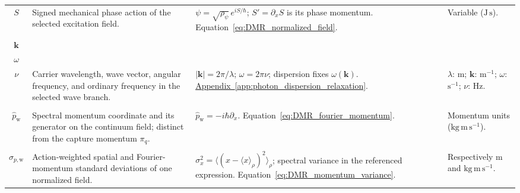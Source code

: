 \begin{longtable}{@{} c p{5.5cm} p{4cm} p{3.5cm} @{}}
$S$ & {\raggedright Signed mechanical phase action of the selected excitation field.\par} & {\raggedright $\psi=\sqrt{\rho_\psi}\,e^{iS/\hbar}$; $S'=\partial_xS$ is its phase momentum. \newline Equation~\eqref{eq:DMR_normalized_field}.\par} & {\raggedright Variable ($\mathrm{J\,s}$).\par} \\

\begin{tabular}[c]{@{}c@{}}$\lambda$ \\ $\mathbf k$ \\ $\omega$ \\ $\nu$\end{tabular} & {\raggedright Carrier wavelength, wave vector, angular frequency, and ordinary frequency in the selected wave branch.\par} & {\raggedright $|\mathbf k|=2\pi/\lambda$; $\omega=2\pi\nu$; dispersion fixes $\omega(\mathbf k)$. \newline \hyperref[app:photon_dispersion_relaxation]{Appendix~\ref*{app:photon_dispersion_relaxation}}.\par} & {\raggedright $\lambda$: $\mathrm m$; $\mathbf k$: $\mathrm{m^{-1}}$; $\omega$: $\mathrm{s^{-1}}$; $\nu$: $\mathrm{Hz}$.\par} \\


\begin{tabular}[c]{@{}c@{}}$p_{\mathrm w}$ \\ $\widehat p_{\mathrm w}$\end{tabular} & {\raggedright Spectral momentum coordinate and its generator on the continuum field; distinct from the capture momentum $\pi_q$.\par} & {\raggedright $\widehat p_{\mathrm w}=-i\hbar\partial_x$. \newline Equation~\eqref{eq:DMR_fourier_momentum}.\par} & {\raggedright Momentum units ($\mathrm{kg\,m\,s^{-1}}$).\par} \\

\begin{tabular}[c]{@{}c@{}}$\sigma_x$ \\ $\sigma_{p,\mathrm w}$\end{tabular} & {\raggedright Action-weighted spatial and Fourier-momentum standard deviations of one normalized field.\par} & {\raggedright $\sigma_x^2=\langle(x-\langle x\rangle_\rho)^2\rangle_\rho$; spectral variance in the referenced expression. \newline Equation~\eqref{eq:DMR_momentum_variance}.\par} & {\raggedright Respectively $\mathrm m$ and $\mathrm{kg\,m\,s^{-1}}$.\par} \\


\end{longtable}
